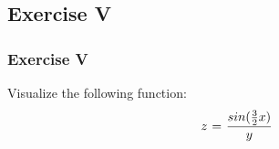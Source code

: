 

\subsection{Exercise V}
\begin{frame}
	\frametitle{Exercise V}
	Visualize the following function:
	\begin{equation}
		z \hspace{0.01in} =\hspace{0.01in} \frac{sin(\frac{3}{2}x)}{y}
	\end{equation}	
\end{frame}

